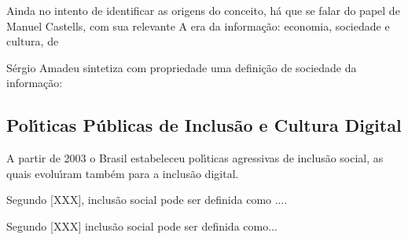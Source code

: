 \documentclass[
12pt,		%
openright,	%
twoside,  %
a4paper,			%
chapter=TITLE,		%
english,			%
french,				%
spanish,			%
brazil				%
]{USPSC-classe/USPSC_RedarTex}
\begin{document}
Ainda no intento de identificar as origens do conceito, h\'a que se falar do papel de Manuel Castells, com sua relevante \textquotedbl A era da informa\c{c}\~ao: economia, sociedade e cultura, de 








S\'ergio Amadeu sintetiza com propriedade uma defini\c{c}\~ao de sociedade da informa\c{c}\~ao: 









\noindent\begin{center}\mbox{\centering{}}\end{center}


\subsection[Pol\'{\i}ticas P\'ublicas de Inclus\~ao e Cultura Digital]{Pol\'{\i}ticas P\'ublicas de Inclus\~ao e Cultura Digital}\label{Pol\'{\i}ticas P\'ublicas de Inclus\~ao e Cultura Digital}
A partir de 2003 o Brasil estabeleceu pol\'{\i}ticas agressivas de inclus\~ao social, as quais evolu\'{\i}ram tamb\'em para a inclus\~ao digital.








Segundo [XXX], inclus\~ao social pode ser definida como ....








Segundo [XXX] inclus\~ao social pode ser definida como...
\end{document}
